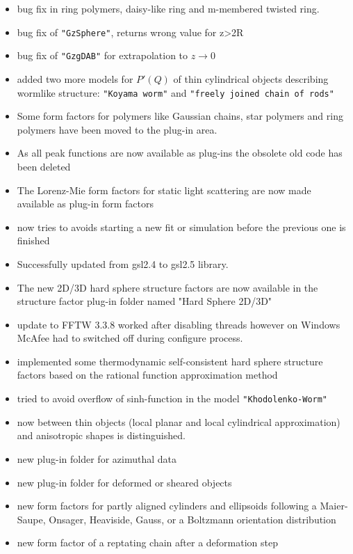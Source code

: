 \begin{description}
\begin{itemize}
    \item bug fix in ring polymers, daisy-like ring and m-membered twisted ring.
    \item bug fix of \texttt{"GzSphere"}, returns wrong value for z>2R
    \item bug fix of \texttt{"GzgDAB"} for extrapolation to $z\rightarrow 0$
    \item added two more models for $P'(Q)$ of thin cylindrical objects describing wormlike structure: \texttt{"Koyama worm"} and \texttt{"freely joined chain of rods"}
    \item Some form factors for polymers like Gaussian chains, star polymers and ring polymers have been moved to the plug-in area.
    \item As all peak functions are now available as plug-ins the obsolete old code has been deleted
    \item The Lorenz-Mie form factors for static light scattering are now made available as plug-in form factors
    \item \SASfit now tries to avoids starting a new fit or simulation before the previous one is finished
    \item Successfully updated from gsl2.4 to gsl2.5 library.
    \item The new 2D/3D hard sphere structure factors are now available in the structure factor plug-in folder named "Hard Sphere 2D/3D"
    \item update to FFTW 3.3.8 worked after disabling threads however on Windows McAfee had to switched off during configure process.
    \item implemented some thermodynamic self-consistent hard sphere structure factors based on the rational function approximation method
    \item tried to avoid overflow of sinh-function in the model \texttt{"Khodolenko-Worm"}
    \item now between thin objects (local planar and local cylindrical approximation) and anisotropic shapes is distinguished.
    \item new plug-in folder for azimuthal data
    \item new plug-in folder for deformed or sheared objects
    \item new form factors for partly aligned cylinders and ellipsoids following a Maier-Saupe, Onsager, Heaviside, Gauss, or a Boltzmann orientation distribution
    \item new form factor of a reptating chain after a deformation step

\end{itemize}
\end{description}
